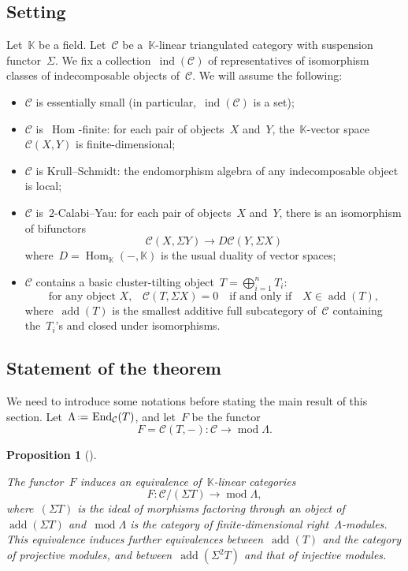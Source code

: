 \documentclass{amsart}
\newtheorem{proposition}[theorem]{Proposition}
\theoremstyle{definition}
\newcommand{\eqdef}{\mbox{\,\raisebox{0.2ex}{\scriptsize\ensuremath{\mathrm:}}\ensuremath{=}\,}} %
\newcommand{\field}{\mathbb{K}}
\newcommand{\cat}{\mathcal{C}}
\newcommand{\Hom}[1]{\operatorname{Hom}_{#1}}
\newcommand{\susp}{\Sigma}
\newcommand{\add}{\operatorname{add}}
\newcommand{\MOD}{\operatorname{mod}}
\newcommand{\End}[1]{\operatorname{End}_{#1}}
\newcommand{\ind}{\operatorname{ind}}
\begin{document}
\subsection{Setting}\label{sect::setting}
Let~$\field$ be a field.  Let~$\cat$ be a~$\field$-linear triangulated category with suspension functor~$\susp$.  We fix a collection~$\ind(\cat)$ of representatives of isomorphism classes of indecomposable objects of~$\cat$. We will assume the following:
\begin{itemize}
 \item $\cat$ is essentially small (in particular,~$\ind(\cat)$ is a set);
 \item $\cat$ is~$\Hom{}$-finite: for each pair of objects~$X$ and~$Y$, the~$\field$-vector space~$\cat(X,Y)$ is finite-dimensional;
 \item $\cat$ is Krull--Schmidt: the endomorphism algebra of any indecomposable object is local;
 \item $\cat$ is~$2$-Calabi--Yau: for each pair of objects~$X$ and~$Y$, there is an isomorphism of bifunctors
 \[
  \cat(X,\susp Y) \to D\cat(Y,\susp X)
 \]
 where~$D=\Hom{\field}(-,\field)$ is the usual duality of vector spaces;
 \item $\cat$ contains a basic cluster-tilting object~$T=\bigoplus_{i=1}^n T_i$:
 \[
  \textrm{for any object~$X$,} \quad \cat(T, \susp X) = 0 \quad \textrm{if and only if} \quad X\in \add(T),
 \]
 where~$\add(T)$ is the smallest additive full subcategory of~$\cat$ containing the~$T_i$'s and closed under isomorphisms.
\end{itemize}


\subsection{Statement of the theorem}\label{subsect::Statement cluster cats}
We need to introduce some notations before stating the main result of this section.  Let~$\Lambda\eqdef \End{\cat}(T)$, and let~$F$ be the functor
\[
F = \cat(T,-): \cat \xrightarrow{} \MOD \Lambda.
\]

\begin{proposition}[\cite{BuanMarshReiten, KellerReiten}]\label{prop::functor-F}

The functor~$F$ induces an equivalence of~$\field$-linear categories
 \[
  F:\cat/(\susp T) \xrightarrow{} \MOD \Lambda,
 \]
 where~$(\susp T)$ is the ideal of morphisms factoring through an object of~$\add(\susp T)$ and~$\MOD \Lambda$ is the category of finite-dimensional right~$\Lambda$-modules.  This equivalence induces further equivalences between~$\add(T)$ and the category of projective modules, and between~$\add(\susp^2 T)$ and that of injective modules.
\end{proposition}
\end{document}
